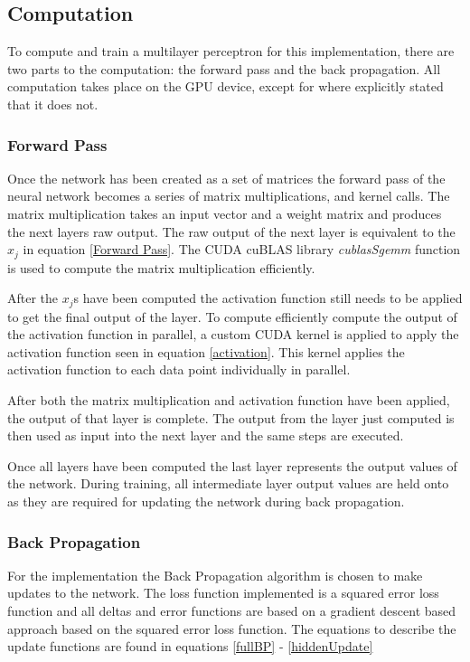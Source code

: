 \documentclass[jair, twoside,11pt,theapa]{article}
\begin{document}
\subsection{Computation}
To compute and train a multilayer perceptron for this implementation, there are two parts to the computation: the forward pass and the back propagation. 
All computation takes place on the GPU device, except for where explicitly stated that it does not. 
\subsubsection{Forward Pass}
\label{FPSection}
Once the network has been created as a set of matrices the forward pass of the neural network becomes a series of matrix multiplications, and kernel calls.
The matrix multiplication takes an input vector and a weight matrix and produces the next layers raw output. 
The raw output of the next layer is equivalent to the $x_j$ in equation \ref{Forward Pass}. 
The CUDA cuBLAS library \textit{cublasSgemm} function is used to compute the matrix multiplication efficiently.

After the $x_j$s have been computed the activation function still needs to be applied to get the final output of the layer. 
To compute efficiently compute the output of the activation function in parallel, a custom CUDA kernel is applied to apply the activation function seen in equation \ref{activation}.
This kernel applies the activation function to each data point individually in parallel. 

After both the matrix multiplication and activation function have been applied, the output of that layer is complete. 
The output from the layer just computed is then used as input into the next layer and the same steps are executed. 

Once all layers have been computed the last layer represents the output values of the network. 
During training, all intermediate layer output values are held onto as they are required for updating the network during back propagation. 

\subsubsection{Back Propagation}
For the implementation the Back Propagation algorithm is chosen to make updates to the network. 
The loss function implemented is a squared error loss function and all deltas and error functions are based on a gradient descent based approach based on the squared error loss function. 
The equations to describe the update functions are found in equations \ref{fullBP} - \ref{hiddenUpdate}
\end{document}
